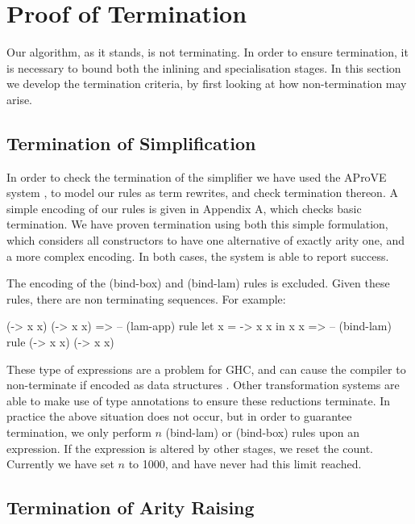 \documentclass[preprint]{sigplanconf}
\begin{document}
\section{Proof of Termination}
\label{sec:termination}

Our algorithm, as it stands, is not terminating. In order to ensure termination, it is necessary to bound both the inlining and specialisation stages. In this section we develop the termination criteria, by first looking at how non-termination may arise.

\subsection{Termination of Simplification}
\label{sec:termination_simplification}

In order to check the termination of the simplifier we have used the AProVE system \cite{aprove}, to model our rules as term rewrites, and check termination thereon. A simple encoding of our rules is given in Appendix A, which checks basic termination. We have proven termination using both this simple formulation, which considers all constructors to have one alternative of exactly arity one, and a more complex encoding. In both cases, the system is able to report success.

The encoding of the (bind-box) and (bind-lam) rules is excluded. Given these rules, there are non terminating sequences. For example:

\begin{code}
(\x -> x x) (\x -> x x)
   => -- (lam-app) rule
let x = \x -> x x in x x
   => -- (bind-lam) rule
(\x -> x x) (\x -> x x)
\end{code}

These type of expressions are a problem for GHC, and can cause the compiler to non-terminate if encoded as data structures \cite{spj:inlining}. Other transformation systems \cite{chin:higher_order_removal} are able to make use of type annotations to ensure these reductions terminate. In practice the above situation does not occur, but in order to guarantee termination, we only perform $n$ (bind-lam) or (bind-box) rules upon an expression. If the expression is altered by other stages, we reset the count. Currently we have set $n$ to 1000, and have never had this limit reached.

\subsection{Termination of Arity Raising}
\end{document}
